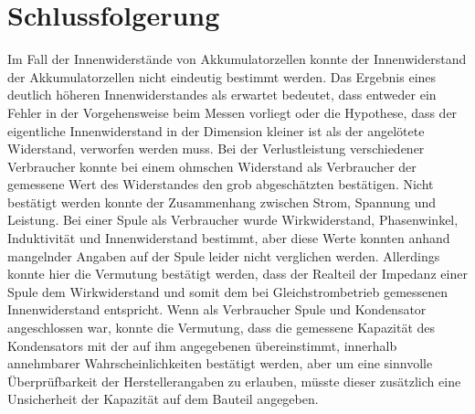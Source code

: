 \documentclass[
	a4paper,
	12pt,
	pagesize,
	ngerman
]{scrartcl}
\begin{document}
	\section{Schlussfolgerung}
	Im Fall der Innenwiderstände von Akkumulatorzellen konnte der Innenwiderstand der Akkumulatorzellen nicht eindeutig bestimmt werden.
	Das Ergebnis eines deutlich höheren Innenwiderstandes als erwartet bedeutet, dass entweder ein Fehler in der Vorgehensweise beim Messen vorliegt oder die Hypothese, dass der eigentliche Innenwiderstand in der Dimension kleiner ist als der angelötete Widerstand, verworfen werden muss.
	Bei der Verlustleistung verschiedener Verbraucher konnte bei einem ohmschen Widerstand als Verbraucher der gemessene Wert des Widerstandes den grob abgeschätzten bestätigen.
	Nicht bestätigt werden konnte der Zusammenhang zwischen Strom, Spannung und Leistung.
	Bei einer Spule als Verbraucher wurde Wirkwiderstand, Phasenwinkel, Induktivität und Innenwiderstand bestimmt, aber diese Werte konnten anhand mangelnder Angaben auf der Spule leider nicht verglichen werden.
	Allerdings konnte hier die Vermutung bestätigt werden, dass der Realteil der Impedanz einer Spule dem Wirkwiderstand und somit dem bei Gleichstrombetrieb gemessenen Innenwiderstand entspricht.
	Wenn als Verbraucher Spule und Kondensator angeschlossen war, konnte die Vermutung, dass die gemessene Kapazität des Kondensators mit der auf ihm angegebenen übereinstimmt, innerhalb annehmbarer Wahrscheinlichkeiten bestätigt werden, aber um eine sinnvolle Überprüfbarkeit der Herstellerangaben zu erlauben, müsste dieser zusätzlich eine Unsicherheit der Kapazität auf dem Bauteil angegeben.
	
\end{document}
